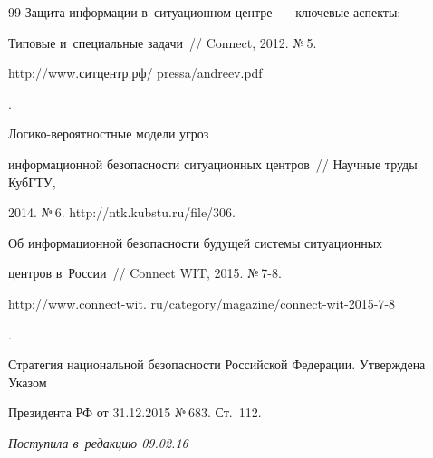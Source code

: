 {{\begin{thebibliography}{99}
 Защита информации в~ситуационном центре~--- ключевые аспекты: 

Типовые и~специальные задачи~/\!\!/ Connect, 2012. №\,5. {\sf 

http://www.ситцентр.рф/ pressa/andreev.pdf}. 




 Логико-ве\-ро\-ят\-ност\-ные модели угроз 

информационной безопасности ситуационных центров~/\!\!/ Научные труды КубГТУ, 

2014. №\,6. {\sf http://ntk.kubstu.ru/file/306}. 




 Об информационной безопасности будущей сис\-те\-мы ситуационных 

центров в~России~/\!\!/ Connect WIT, 2015. №\,7-8. {\sf  

http://www.connect-wit. ru/category/magazine/connect-wit-2015-7-8}.




Стратегия национальной безопасности Российской Федерации. Утверждена Указом 

Президента РФ от 31.12.2015 №\,683. Ст.~112.

      \end{thebibliography}

} }





\vspace*{-3pt}



\hfill{\small\textit{Поступила в~редакцию 09.02.16}}





\newpage















\vspace*{-24pt}








